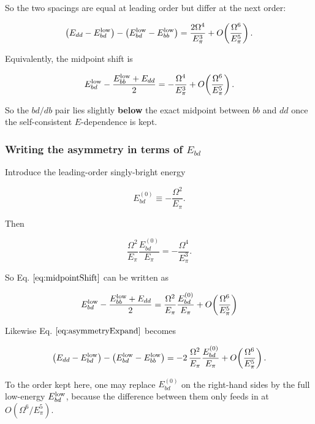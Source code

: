 \documentclass[
]{article}
\renewcommand{\[}{\begin{equation}}
\renewcommand{\]}{\end{equation}}
\begin{document}
So the two spacings are equal at leading order but differ at the next
order:

\[
\big(E_{dd}-E_{bd}^{\rm low}\big)-\big(E_{bd}^{\rm low}-E_{bb}^{\rm low}\big) =
\frac{2\Omega^4}{E_\pi^3}
+
O\!\left(\frac{\Omega^6}{E_\pi^5}\right).
\label{eq:asymmetryExpand}
\]

Equivalently, the midpoint shift is

\[
E_{bd}^{\rm low}-\frac{E_{bb}^{\rm low}+E_{dd}}{2} =
-\frac{\Omega^4}{E_\pi^3}
+
O\!\left(\frac{\Omega^6}{E_\pi^5}\right).
\label{eq:midpointShift}
\]

So the \(bd/db\) pair lies slightly \textbf{below} the exact midpoint
between \(bb\) and \(dd\) once the self-consistent \(E\)-dependence is
kept.

\subsubsection{\texorpdfstring{Writing the asymmetry in terms of
\(E_{bd}\)}{Writing the asymmetry in terms of E\_\{bd\}}}\label{writing-the-asymmetry-in-terms-of-e_bd}

Introduce the leading-order singly-bright energy

\[
E_{bd}^{(0)}\equiv -\frac{\Omega^2}{E_\pi}.
\label{eq:Ebd0}
\]

Then

\[
\frac{\Omega^2}{E_\pi}\frac{E_{bd}^{(0)}}{E_\pi} =
-\frac{\Omega^4}{E_\pi^3}.
\label{eq:Ebd0Identity}
\]

So Eq. \(\ref{eq:midpointShift}\) can be written as

\[
E_{bd}^{\rm low}-\frac{E_{bb}^{\rm low}+E_{dd}}{2} =
\frac{\Omega^2}{E_\pi}\frac{E_{bd}^{(0)}}{E_\pi}
+
O\!\left(\frac{\Omega^6}{E_\pi^5}\right)
\label{eq:midpointShiftEbd0}
\]

Likewise Eq. \(\ref{eq:asymmetryExpand}\) becomes

\[
\big(E_{dd}-E_{bd}^{\rm low}\big)-\big(E_{bd}^{\rm low}-E_{bb}^{\rm low}\big) =
-2\,\frac{\Omega^2}{E_\pi}\frac{E_{bd}^{(0)}}{E_\pi}
+
O\!\left(\frac{\Omega^6}{E_\pi^5}\right).
\label{eq:asymmetryEbd0}
\]

To the order kept here, one may replace \(E_{bd}^{(0)}\) on the
right-hand sides by the full low-energy \(E_{bd}^{\rm low}\), because
the difference between them only feeds in at \(O(\Omega^6/E_\pi^5)\).

\printbibliography
\end{document}
